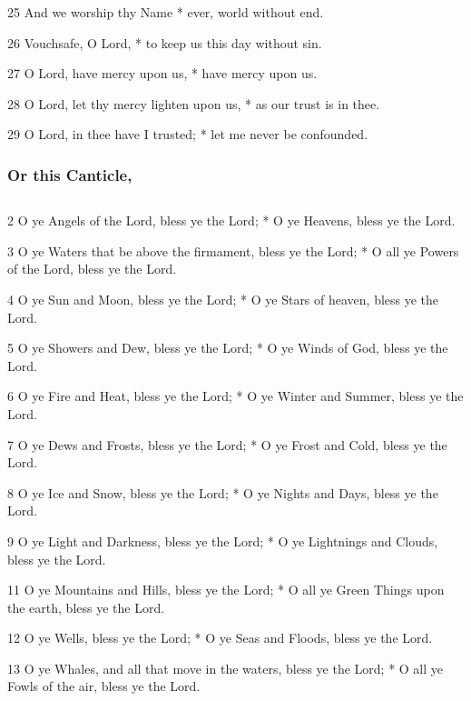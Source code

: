 25 And we worship thy Name * ever, world without end.

26 Vouchsafe, O Lord, * to keep us this day without sin.

27 O Lord, have mercy upon us, * have mercy upon us.

28 O Lord, let thy mercy lighten upon us, * as our trust is in thee.

29 O Lord, in thee have I trusted; * let me never be confounded.

\subsubsection{Or this Canticle,}

\subsection{}


2 O ye Angels of the Lord, bless ye the Lord; * O ye Heavens, bless ye the Lord.

3 O ye Waters that be above the firmament, bless ye the Lord; * O all ye Powers of the Lord, bless ye the Lord.

4 O ye Sun and Moon, bless ye the Lord; * O ye Stars of heaven, bless ye the Lord.

5 O ye Showers and Dew, bless ye the Lord; * O ye Winds of God, bless ye the Lord.

6 O ye Fire and Heat, bless ye the Lord; * O ye Winter and Summer, bless ye the Lord.

7 O ye Dews and Frosts, bless ye the Lord; * O ye Frost and Cold, bless ye the Lord.

8 O ye Ice and Snow, bless ye the Lord; * O ye Nights and Days, bless ye the Lord.

9 O ye Light and Darkness, bless ye the Lord; * O ye Lightnings and Clouds, bless ye the Lord.


11 O ye Mountains and Hills, bless ye the Lord; * O all ye Green Things upon the earth, bless ye the Lord.

12 O ye Wells, bless ye the Lord; * O ye Seas and Floods, bless ye the Lord.

13 O ye Whales, and all that move in the waters, bless ye the Lord; * O all ye Fowls of the air, bless ye the Lord.

